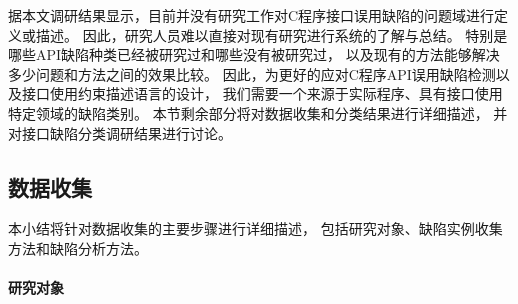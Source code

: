 据本文调研结果显示，目前并没有研究工作对C程序接口误用缺陷的问题域进行定义或描述。
因此，研究人员难以直接对现有研究进行系统的了解与总结。
特别是哪些API缺陷种类已经被研究过和哪些没有被研究过，
以及现有的方法能够解决多少问题和方法之间的效果比较。
因此，为更好的应对C程序API误用缺陷检测以及接口使用约束描述语言的设计，
我们需要一个来源于实际程序、具有接口使用特定领域的缺陷类别。
本节剩余部分将对数据收集和分类结果进行详细描述，
并对接口缺陷分类调研结果进行讨论。

\subsection{数据收集}
本小结将针对数据收集的主要步骤进行详细描述，
包括研究对象、缺陷实例收集方法和缺陷分析方法。

\paragraph{研究对象}


